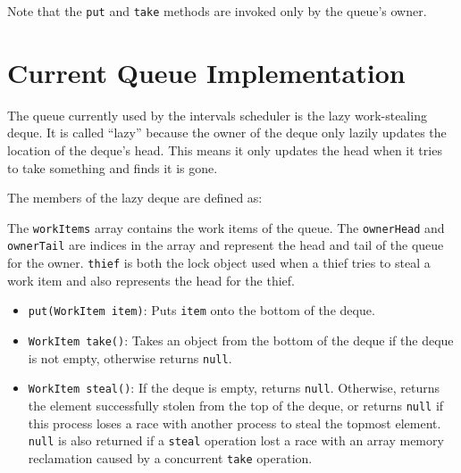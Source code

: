 Note that the \lstinline!put! and \lstinline!take! methods are invoked
only by the queue's owner.


\section{Current Queue Implementation}
\label{sec:queues-background-current-implementation}


The queue currently used by the intervals scheduler is the lazy
work-stealing deque. It is called ``lazy'' because the owner of the
deque only lazily updates the location of the deque's head. This means
it only updates the head when it tries to take something and finds it
is gone.

The members of the lazy deque are defined as:



The \lstinline!workItems! array contains the work items of the
queue. The \lstinline!ownerHead! and \lstinline!ownerTail! are indices
in the array and represent the head and tail of the queue for the
owner. \lstinline!thief! is both the lock object used when a thief
tries to steal a work item and also represents the head for the thief.

\begin{itemize}
\item \lstinline!put(WorkItem item)!: Puts \lstinline!item! onto the
  bottom of the deque.
\item \lstinline!WorkItem take()!: Takes an object from the bottom of
  the deque if the deque is not empty, otherwise returns
  \lstinline!null!.
\item \lstinline!WorkItem steal()!: If the deque is empty, returns
  \lstinline!null!. Otherwise, returns the element successfully stolen
  from the top of the deque, or returns \lstinline!null! if this
  process loses a race with another process to steal the topmost
  element. \lstinline!null! is also returned if a \lstinline!steal!
  operation lost a race with an array memory reclamation caused by a
  concurrent \lstinline!take! operation.
\end{itemize}



